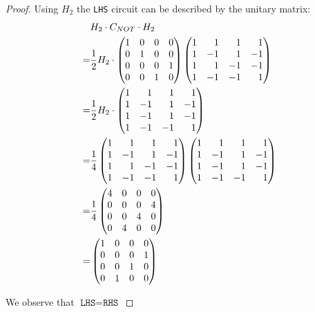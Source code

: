 \begin{proof}
\noindent Using $H_2$ the \texttt{LHS} circuit can be described by the unitary matrix:
\begin{align*}
    &H_2 \cdot C_{NOT} \cdot H_2\\
    =& \frac{1}{2} H_2 \cdot  \begin{pmatrix*}[r] 1&0&0&0 \\ 0&1&0&0 \\ 0&0&0&1\\0&0&1&0 \end{pmatrix*}\hmantwo\\
    =&\frac{1}{2} H_2 \cdot \begin{pmatrix*}[r] 1&1&1&1 \\ 1&-1&1&-1 \\ 1&-1&1&-1\\1&-1&-1&1 \end{pmatrix*}\\
    =&\frac{1}{4} \hmantwo \begin{pmatrix*}[r] 1&1&1&1 \\ 1&-1&1&-1 \\ 1&-1&1&-1\\1&-1&-1&1 \end{pmatrix*}\\
    =&\frac{1}{4} \begin{pmatrix*}[r] 4&0&0&0 \\ 0&0&0&4 \\ 0&0&4&0\\0&4&0&0 \end{pmatrix*}\\
    =&\begin{pmatrix*}[r] 1&0&0&0 \\ 0&0&0&1 \\ 0&0&1&0\\0&1&0&0 \end{pmatrix*}
\end{align*}

\noindent We observe that $\texttt{LHS}=\texttt{RHS}$
\end{proof}
